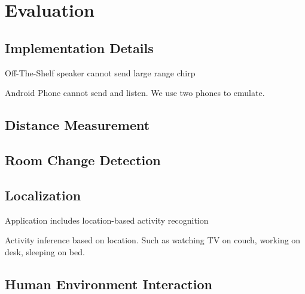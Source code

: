 \section{Evaluation}
\label{sec:eval}

\subsection{Implementation Details}

Off-The-Shelf speaker cannot send large range chirp


Android Phone cannot send and listen. We use two phones to emulate.



\subsection{Distance Measurement}










\subsection{Room Change Detection}



\subsection{Localization}

Application includes location-based activity recognition

Activity inference based on location. Such as watching TV on couch, working on desk, sleeping on bed.


\subsection{Human Environment Interaction}